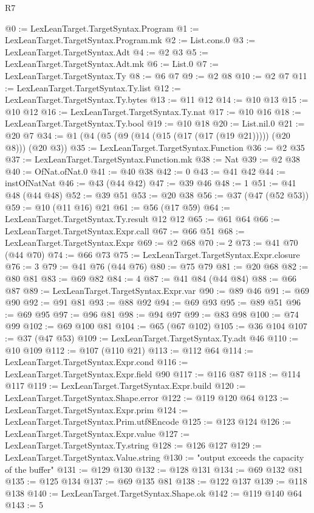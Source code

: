 \begin{lexlean}{R7}
\begin{coremodule}
@0 := LexLeanTarget.TargetSyntax.Program
@1 := LexLeanTarget.TargetSyntax.Program.mk
@2 := List.cons.{0}
@3 := LexLeanTarget.TargetSyntax.Adt
@4 := @2 @3
@5 := LexLeanTarget.TargetSyntax.Adt.mk
@6 := List.{0}
@7 := LexLeanTarget.TargetSyntax.Ty
@8 := @6 @7
@9 := @2 @8
@10 := @2 @7
@11 := LexLeanTarget.TargetSyntax.Ty.list
@12 := LexLeanTarget.TargetSyntax.Ty.bytes
@13 := @11 @12
@14 := @10 @13
@15 := @10 @12
@16 := LexLeanTarget.TargetSyntax.Ty.nat
@17 := @10 @16
@18 := LexLeanTarget.TargetSyntax.Ty.bool
@19 := @10 @18
@20 := List.nil.{0}
@21 := @20 @7
@34 := @1 (@4 (@5 (@9 (@14 (@15 (@17 (@17 (@19 @21))))) (@20 @8))) (@20 @3))
@35 := LexLeanTarget.TargetSyntax.Function
@36 := @2 @35
@37 := LexLeanTarget.TargetSyntax.Function.mk
@38 := Nat
@39 := @2 @38
@40 := OfNat.ofNat.{0}
@41 := @40 @38
@42 := 0
@43 := @41 @42
@44 := instOfNatNat
@46 := @43 (@44 @42)
@47 := @39 @46
@48 := 1
@51 := @41 @48 (@44 @48)
@52 := @39 @51
@53 := @20 @38
@56 := @37 (@47 (@52 @53))
@59 := @10 (@11 @16) @21
@61 := @56 (@17 @59)
@64 := LexLeanTarget.TargetSyntax.Ty.result @12 @12
@65 := @61 @64
@66 := LexLeanTarget.TargetSyntax.Expr.call
@67 := @66 @51
@68 := LexLeanTarget.TargetSyntax.Expr
@69 := @2 @68
@70 := 2
@73 := @41 @70 (@44 @70)
@74 := @66 @73
@75 := LexLeanTarget.TargetSyntax.Expr.closure
@76 := 3
@79 := @41 @76 (@44 @76)
@80 := @75 @79
@81 := @20 @68
@82 := @80 @81
@83 := @69 @82
@84 := 4
@87 := @41 @84 (@44 @84)
@88 := @66 @87
@89 := LexLeanTarget.TargetSyntax.Expr.var
@90 := @89 @46
@91 := @69 @90
@92 := @91 @81
@93 := @88 @92
@94 := @69 @93
@95 := @89 @51
@96 := @69 @95
@97 := @96 @81
@98 := @94 @97
@99 := @83 @98
@100 := @74 @99
@102 := @69 @100 @81
@104 := @65 (@67 @102)
@105 := @36 @104
@107 := @37 (@47 @53)
@109 := LexLeanTarget.TargetSyntax.Ty.adt @46
@110 := @10 @109
@112 := @107 (@110 @21)
@113 := @112 @64
@114 := LexLeanTarget.TargetSyntax.Expr.cond
@116 := LexLeanTarget.TargetSyntax.Expr.field @90
@117 := @116 @87
@118 := @114 @117
@119 := LexLeanTarget.TargetSyntax.Expr.build
@120 := LexLeanTarget.TargetSyntax.Shape.error
@122 := @119 @120 @64
@123 := LexLeanTarget.TargetSyntax.Expr.prim
@124 := LexLeanTarget.TargetSyntax.Prim.utf8Encode
@125 := @123 @124
@126 := LexLeanTarget.TargetSyntax.Expr.value
@127 := LexLeanTarget.TargetSyntax.Ty.string
@128 := @126 @127
@129 := LexLeanTarget.TargetSyntax.Value.string
@130 := "output exceeds the capacity of the buffer"
@131 := @129 @130
@132 := @128 @131
@134 := @69 @132 @81
@135 := @125 @134
@137 := @69 @135 @81
@138 := @122 @137
@139 := @118 @138
@140 := LexLeanTarget.TargetSyntax.Shape.ok
@142 := @119 @140 @64
@143 := 5

\end{coremodule}
\end{lexlean}
